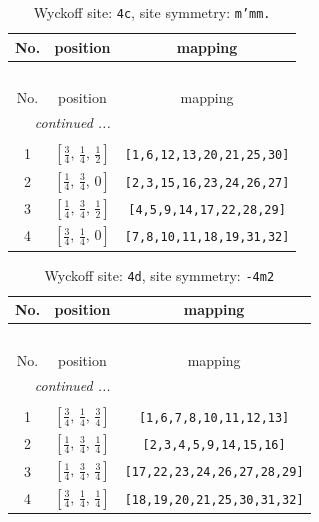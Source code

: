 \documentclass[fleqn,8pt]{jsarticle}
\begin{document}
\renewcommand{\arraystretch}{1.2}
\begin{longtable}{ccc}
\caption{Wyckoff site: {\tt 4c}, site symmetry: {\tt m'mm.}}
 \\
 \hline \hline
No. & position & mapping \\ \hline \endfirsthead

\multicolumn{2}{l}{\tablename\ \thetable{}} \\
 \hline \hline
No. & position & mapping \\ \hline \endhead

 \hline \hline
\multicolumn{2}{r}{\footnotesize\it continued ...} \\ \endfoot

 \hline \hline
\multicolumn{2}{r}{} \\ \endlastfoot

1 & $\left[ \frac{3}{4},\, \frac{1}{4},\, \frac{1}{2} \right]$ & {\tt [1,6,12,13,20,21,25,30]} \\ \hline
2 & $\left[ \frac{1}{4},\, \frac{3}{4},\, 0 \right]$ & {\tt [2,3,15,16,23,24,26,27]} \\ \hline
3 & $\left[ \frac{1}{4},\, \frac{3}{4},\, \frac{1}{2} \right]$ & {\tt [4,5,9,14,17,22,28,29]} \\ \hline
4 & $\left[ \frac{3}{4},\, \frac{1}{4},\, 0 \right]$ & {\tt [7,8,10,11,18,19,31,32]} \\
\end{longtable}
\renewcommand{\arraystretch}{1.2}
\begin{longtable}{ccc}
\caption{Wyckoff site: {\tt 4d}, site symmetry: {\tt -4m2}}
 \\
 \hline \hline
No. & position & mapping \\ \hline \endfirsthead

\multicolumn{2}{l}{\tablename\ \thetable{}} \\
 \hline \hline
No. & position & mapping \\ \hline \endhead

 \hline \hline
\multicolumn{2}{r}{\footnotesize\it continued ...} \\ \endfoot

 \hline \hline
\multicolumn{2}{r}{} \\ \endlastfoot

1 & $\left[ \frac{3}{4},\, \frac{1}{4},\, \frac{3}{4} \right]$ & {\tt [1,6,7,8,10,11,12,13]} \\ \hline
2 & $\left[ \frac{1}{4},\, \frac{3}{4},\, \frac{1}{4} \right]$ & {\tt [2,3,4,5,9,14,15,16]} \\ \hline
3 & $\left[ \frac{1}{4},\, \frac{3}{4},\, \frac{3}{4} \right]$ & {\tt [17,22,23,24,26,27,28,29]} \\ \hline
4 & $\left[ \frac{3}{4},\, \frac{1}{4},\, \frac{1}{4} \right]$ & {\tt [18,19,20,21,25,30,31,32]} \\
\end{longtable}
\end{document}
